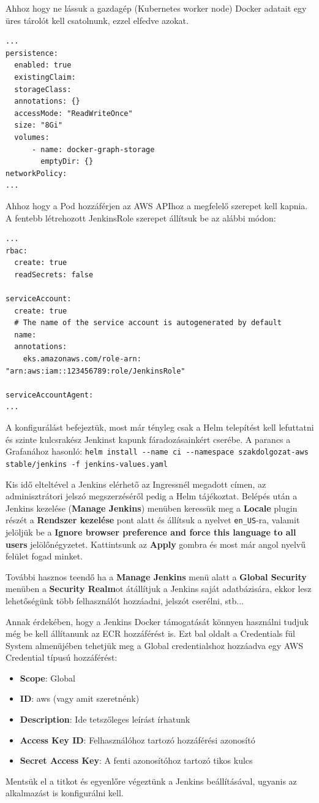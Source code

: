 Ahhoz hogy ne lássuk a gazdagép (Kubernetes worker node) Docker adatait egy üres tárolót kell csatolnunk, ezzel elfedve azokat.\cite{dind_ci}
\begin{lstlisting}
...
persistence:
  enabled: true
  existingClaim:
  storageClass:
  annotations: {}
  accessMode: "ReadWriteOnce"
  size: "8Gi"
  volumes:
      - name: docker-graph-storage
        emptyDir: {}
networkPolicy:
...
\end{lstlisting}
Ahhoz hogy a Pod hozzáférjen az AWS APIhoz a megfelelő szerepet kell kapnia. A fentebb létrehozott JenkinsRole szerepet állítsuk be az alábbi módon:
\begin{lstlisting}
...
rbac:
  create: true
  readSecrets: false

serviceAccount:
  create: true
  # The name of the service account is autogenerated by default
  name:
  annotations:
    eks.amazonaws.com/role-arn: "arn:aws:iam::123456789:role/JenkinsRole"

serviceAccountAgent:
...
\end{lstlisting}
A konfigurálást befejeztük, most már tényleg csak a Helm telepítést kell lefuttatni és szinte kulcsrakész Jenkinst kapunk fáradozásainkért cserébe. A parancs a Grafanához hasonló: \lstinline{helm install --name ci --namespace szakdolgozat-aws stable/jenkins -f jenkins-values.yaml}

Kis idő elteltével a Jenkins elérhető az Ingressnél megadott címen, az adminisztrátori jelszó megszerzéséről pedig a Helm tájékoztat. Belépés után a Jenkins kezelése (\textbf{Manage Jenkins}) menüben keressük meg a \textbf{Locale} plugin részét a \textbf{Rendszer kezelése} pont alatt és állítsuk a nyelvet \lstinline{en_US}-ra, valamit jelöljük be a \textbf{Ignore browser preference and force this language to all users} jelölőnégyzetet. Kattintsunk az \textbf{Apply} gombra és most már angol nyelvű felület fogad minket.

További hasznos teendő ha a \textbf{Manage Jenkins} menü alatt a \textbf{Global Security} menüben a \textbf{Security Realm}ot átállítjuk a Jenkins saját adatbázisára, ekkor lesz lehetőségünk több felhasználót hozzáadni, jelszót cserélni, stb...

Annak érdekében, hogy a Jenkins Docker támogatását könnyen használni tudjuk még be kell állítanunk az ECR hozzáférést is. Ezt bal oldalt a Credentials fül System almenüjében tehetjük meg a Global credentialshoz hozzáadva egy AWS Credential típusú hozzáférést:
\begin{itemize}
    \item \textbf{Scope}: Global
    \item \textbf{ID}: aws (vagy amit szeretnénk)
    \item \textbf{Description}: Ide tetszőleges leírást írhatunk
    \item \textbf{Access Key ID}: Felhasználóhoz tartozó hozzáférési azonosító
    \item \textbf{Secret Access Key}: A fenti azonosítóhoz tartozó tikos kulcs
\end{itemize}
Mentsük el a titkot és egyenlőre végeztünk a Jenkins beállításával, ugyanis az alkalmazást is konfigurálni kell.
